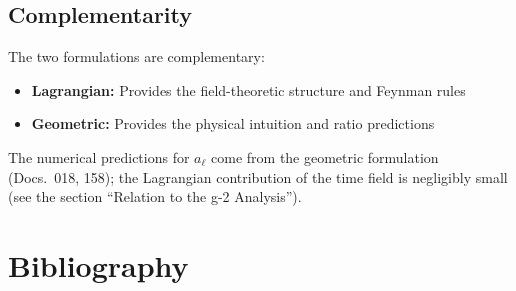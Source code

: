 	\begin{table}[h]
		\centering
		\caption{Comparison of formulations}
		\label{tab:comparison}
	\end{table}
	
	\subsection{Complementarity}
	
	The two formulations are complementary:
	\begin{itemize}
		\item \textbf{Lagrangian:} Provides the field-theoretic structure and Feynman rules
		\item \textbf{Geometric:} Provides the physical intuition and ratio predictions
	\end{itemize}
	
	The numerical predictions for $a_\ell$ come from the geometric formulation (Docs.~018, 158); the Lagrangian contribution of the time field is negligibly small (see the section \enquote{Relation to the g-2 Analysis}).
	
	\section*{Bibliography}
	

